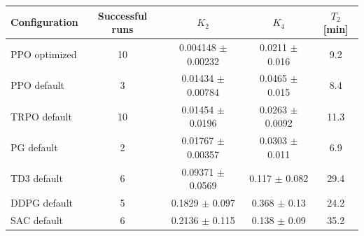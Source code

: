 \begin{tabular}{lcccc}
\toprule
Configuration & Successful runs & $K_2$ & $K_4$ & $T_2$ [min] \\
\midrule
PPO optimized & 10 & 0.004148 $\pm$ 0.00232 & 0.0211 $\pm$ 0.016 & 9.2 \\
PPO default & 3 & 0.01434 $\pm$ 0.00784 & 0.0465 $\pm$ 0.015 & 8.4 \\
TRPO default & 10 & 0.01454 $\pm$ 0.0196 & 0.0263 $\pm$ 0.0092 & 11.3 \\
PG default & 2 & 0.01767 $\pm$ 0.00357 & 0.0303 $\pm$ 0.011 & 6.9 \\
TD3 default & 6 & 0.09371 $\pm$ 0.0569 & 0.117 $\pm$ 0.082 & 29.4 \\
DDPG default & 5 & 0.1829 $\pm$ 0.097 & 0.368 $\pm$ 0.13 & 24.2 \\
SAC default & 6 & 0.2136 $\pm$ 0.115 & 0.138 $\pm$ 0.09 & 35.2 \\
\bottomrule
\end{tabular}
